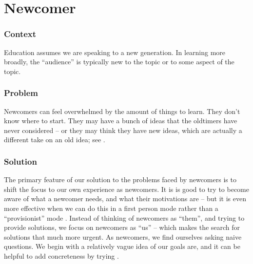 

\section{Newcomer}\label{sec:Newcomer}

\subsubsection*{Context}
Education assumes we are speaking to a new generation. 
In learning more broadly, the ``audience'' is typically new to the topic or to some aspect of the topic.

\subsubsection*{Problem} Newcomers can feel overwhelmed by the amount of things to learn.  They
don't know where to start.  They may have a bunch of ideas that the
oldtimers have never considered -- or they may think they have new
ideas, which are actually a different take on an old idea; see
.

\subsubsection*{Solution}
The primary feature of our solution to the problems faced by newcomers
is to shift the focus to our own experience as newcomers.
It is is good to try to become aware of what a newcomer needs, and what their
motivations are -- but it is even more effective when we can do this in a first
person mode rather than a ``provisionist'' mode \cite{boud2005peer}.  Instead of
thinking of newcomers as ``them'', and trying to provide solutions, we focus
on newcomers as ``us'' -- which makes the search for solutions that much more urgent. 
As newcomers, we find ourselves asking naive questions.
We begin with a relatively vague idea of our goals are, 
and it can be helpful to add concreteness by trying .

%
